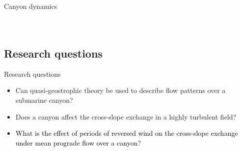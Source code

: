 \documentclass{beamer}
\begin{document}
\begin{frame}{Canyon dynamics}
\begin{columns}
\begin{figure}
\end{figure}
\end{columns}
\end{frame}


\subsection{Research questions}

\begin{frame}{Research questions}
    \begin{itemize}
    \item Can quasi-geostrophic theory be used to describe flow patterns over a submarine canyon?
    \item Does a canyon affect the cross-slope exchange in a highly turbulent field?
    \item \textcolor{black}{What is the effect of periods of reversed wind on the cross-slope exchange under mean prograde flow over a canyon?} 
\end{itemize}

\end{frame}

\end{document}
